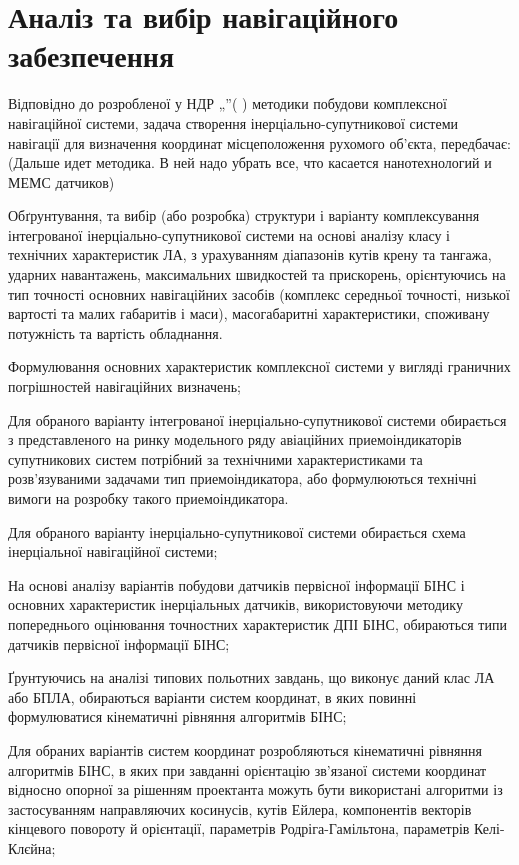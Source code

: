 \section{Аналіз та вибір навігаційного забезпечення}

Відповідно до розробленої у НДР „”( ) методики 
побудови комплексної навігаційної системи, задача створення 
інерціально-супутникової системи навігації для визначення координат 
місцеположення рухомого об'єкта, передбачає: (Дальше идет методика. 
В ней надо убрать все, что касается нанотехнологий и МЕМС датчиков)

Обґрунтування, та вибір (або розробка) структури і варіанту комплексування 
інтегрованої інерціально-супутникової системи на основі аналізу класу і 
технічних характеристик ЛА, з урахуванням діапазонів кутів крену та тангажа, 
ударних навантажень, максимальних швидкостей та прискорень, орієнтуючись на 
тип точності основних навігаційних засобів (комплекс середньої точності, 
низької вартості та малих габаритів і маси), масогабаритні характеристики, 
споживану потужність та вартість обладнання. 

Формулювання основних характеристик комплексної системи у вигляді граничних 
погрішностей навігаційних визначень;

Для обраного варіанту інтегрованої інерціально-супутникової системи 
обирається з представленого на ринку модельного ряду авіаційних 
приемоіндикаторів супутникових систем потрібний за технічними 
характеристиками та розв'язуваними задачами тип приемоіндикатора, або 
формулюються технічні вимоги  на розробку такого приемоіндикатора. 

Для обраного варіанту інерціально-супутникової системи обирається схема 
інерціальної навігаційної системи;

На основі аналізу варіантів побудови датчиків первісної інформації БІНС 
і основних характеристик інерціальных датчиків, використовуючи методику 
попереднього оцінювання точностних характеристик ДПІ БІНС, обираються типи 
датчиків первісної інформації БІНС;

Ґрунтуючись на аналізі типових польотних завдань, що виконує даний клас ЛА 
або БПЛА, обираються варіанти систем координат, в яких повинні формулюватися 
кінематичні рівняння алгоритмів БІНС;

Для обраних варіантів систем координат розробляються кінематичні рівняння 
алгоритмів БІНС, в яких при завданні орієнтацію зв'язаної системи координат 
відносно опорної за рішенням проектанта можуть бути використані алгоритми 
із застосуванням направляючих косинусів, кутів Ейлера, компонентів векторів 
кінцевого повороту й орієнтації, параметрів Родріга-Гамільтона, параметрів 
Келі-Клєйна;

